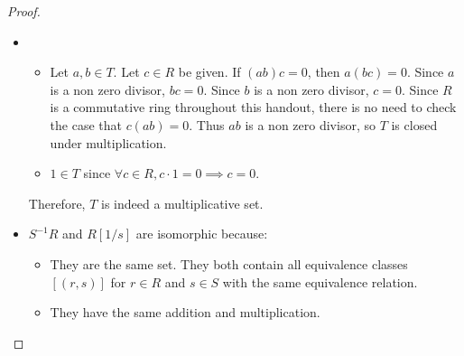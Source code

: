 \documentclass[12pt, psamsfonts]{amsart}
\theoremstyle{definition}
\theoremstyle{remark}
\numberwithin{equation}{section}
\begin{document}
\begin{proof}
  $ $
  \begin{itemize}
    \item
      \begin{itemize}
        \item
          Let $a, b \in T$.
          Let $c \in R$ be given.
          If $(ab)c = 0$, then $a(bc) = 0$.
          Since $a$ is a non zero divisor, $bc = 0$.
          Since $b$ is a non zero divisor, $c = 0$.
          Since $R$ is a commutative ring throughout this handout, there is no need to check the case that $c(ab) = 0$.
          Thus $ab$ is a non zero divisor, so $T$ is closed under multiplication.
        \item
          $1 \in T$ since $\forall c \in R, c \cdot 1 = 0 \implies c = 0$.
      \end{itemize}

      Therefore, $T$ is indeed a multiplicative set.
    \item
      $S^{-1}R$ and $R[1/s]$ are isomorphic because:
      \begin{itemize}
        \item
          They are the same set.
          They both contain all equivalence classes $[(r, s)]$ for $r \in R$ and $s \in S$ with the same equivalence relation.
        \item
          They have the same addition and multiplication.
      \end{itemize}


\end{itemize}
\end{proof}
\end{document}
